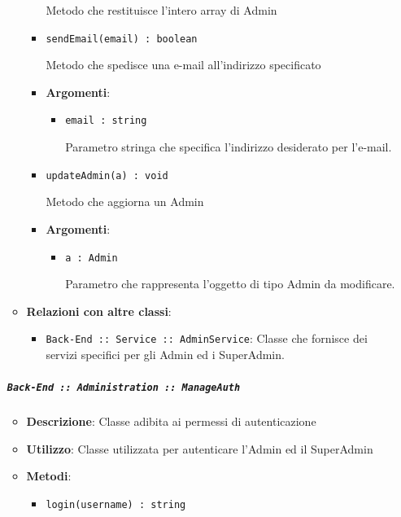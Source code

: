 \documentclass[../DefinizioneDiProdotto.tex]{subfiles}
\begin{document}
\begin{itemize}
\begin{itemize}
\begin{itemize}
	 Metodo che restituisce l'intero array di Admin
	\end{itemize}\vspace{0.5em}
	\begin{itemize}
	\item \texttt{sendEmail(email) : boolean}\

	 Metodo che spedisce una e-mail all'indirizzo specificato

	\item \textbf{Argomenti}:
	\begin{itemize}
	\item \texttt{email : string}\

	 Parametro stringa che specifica l'indirizzo desiderato per l'e-mail.
	\end{itemize}
	\end{itemize}\vspace{0.5em}
	\begin{itemize}
	\item \texttt{updateAdmin(a) : void}\

	 Metodo che aggiorna un Admin

	\item \textbf{Argomenti}:
	\begin{itemize}
	\item \texttt{a : Admin}\

	 Parametro che rappresenta l'oggetto di tipo Admin da modificare.
	\end{itemize}
	\end{itemize}\vspace{0.5em}
	\item \textbf{Relazioni con altre classi}:
	\begin{itemize}
	\item \texttt{Back-End :: Service :: AdminService}: Classe che fornisce dei servizi specifici per gli Admin ed i SuperAdmin.
	\end{itemize}
	\end{itemize}\subparagraph{\texttt{Back-End :: Administration :: ManageAuth}}
	\begin{itemize}\item \textbf{Descrizione}: Classe adibita ai permessi di autenticazione
	\item \textbf{Utilizzo}: Classe utilizzata per autenticare l'Admin ed il SuperAdmin
	\item \textbf{Metodi}:
	\begin{itemize}
	\item \texttt{login(username) : string}\


\end{itemize}
\end{itemize}
\end{itemize}
\end{document}
